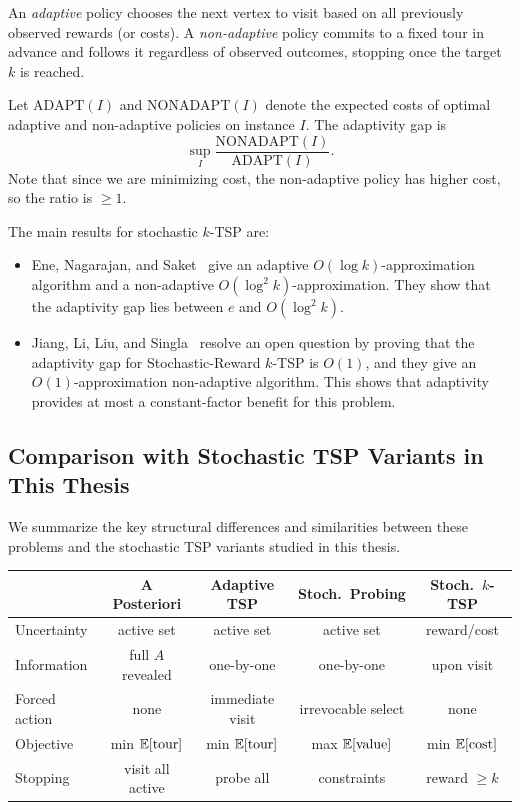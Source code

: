 \begin{definition}
    An \emph{adaptive} policy chooses the next vertex to visit based on all previously observed rewards (or costs). A \emph{non-adaptive} policy commits to a fixed tour in advance and follows it regardless of observed outcomes, stopping once the target $k$ is reached.
\end{definition}

\begin{definition}
    Let $\mathrm{ADAPT}(I)$ and $\mathrm{NONADAPT}(I)$ denote the expected costs of optimal adaptive and non-adaptive policies on instance $I$. The adaptivity gap is
    \[
        \sup_{I} \frac{\mathrm{NONADAPT}(I)}{\mathrm{ADAPT}(I)}.
    \]
    Note that since we are minimizing cost, the non-adaptive policy has higher cost, so the ratio is $\ge 1$.
\end{definition}

The main results for stochastic $k$-TSP are:
\begin{itemize}
    \item Ene, Nagarajan, and Saket~\cite{EneNagarajanSaket2017} give an adaptive $O(\log k)$-approximation algorithm and a non-adaptive $O(\log^2 k)$-approximation. They show that the adaptivity gap lies between $e$ and $O(\log^2 k)$.
    \item Jiang, Li, Liu, and Singla~\cite{JiangLiLiuSingla2020} resolve an open question by proving that the adaptivity gap for Stochastic-Reward $k$-TSP is $O(1)$, and they give an $O(1)$-approximation non-adaptive algorithm. This shows that adaptivity provides at most a constant-factor benefit for this problem.
\end{itemize}

\subsection{Comparison with Stochastic TSP Variants in This Thesis}

We summarize the key structural differences and similarities between these problems and the stochastic TSP variants studied in this thesis.

\begin{center}
\begin{tabular}{l c c c c}
    \hline
    & \textbf{A Posteriori} & \textbf{Adaptive TSP} & \textbf{Stoch.\ Probing} & \textbf{Stoch.\ $k$-TSP} \\
    \hline
    Uncertainty & active set & active set & active set & reward/cost \\
    Information & full $A$ revealed & one-by-one & one-by-one & upon visit \\
    Forced action & none & immediate visit & irrevocable select & none \\
    Objective & min $\mathbb{E}[\text{tour}]$ & min $\mathbb{E}[\text{tour}]$ & max $\mathbb{E}[\text{value}]$ & min $\mathbb{E}[\text{cost}]$ \\
    Stopping & visit all active & probe all & constraints & reward $\ge k$ \\
    \hline
\end{tabular}
\end{center}

